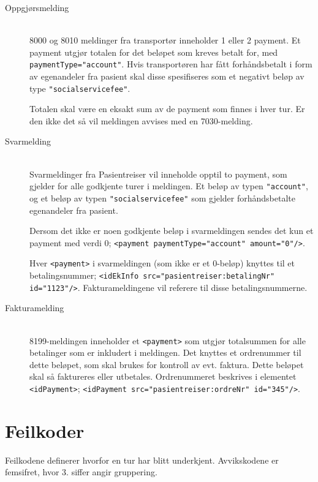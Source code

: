 \documentclass[a4paper,titlepage,norsk,11pt]{article}
\begin{document}
\begin{description}

  \item[Oppgjørsmelding] \hfill \\
  8000 og 8010 meldinger fra transportør inneholder 1 eller 2 payment. Et payment utgjør totalen for det beløpet som kreves betalt for, med \lstinline{paymentType="account"}. Hvis transportøren har fått forhåndsbetalt i form av egenandeler fra pasient skal disse spesifiseres som et negativt beløp av type \lstinline{"socialservicefee"}.

  Totalen skal være en eksakt sum av de payment som finnes i hver tur. Er den ikke det så vil meldingen avvises med en 7030-melding.

  \item[Svarmelding] \hfill \\
  Svarmeldinger fra Pasientreiser vil inneholde opptil to payment, som gjelder for alle godkjente turer i meldingen. Et beløp av typen \lstinline{"account"}, og et beløp av typen \lstinline{"socialservicefee"} som gjelder forhåndsbetalte egenandeler fra pasient.

  Dersom det ikke er noen godkjente beløp i svarmeldingen sendes det kun et payment med verdi 0; \lstinline{<payment paymentType="account" amount="0"/>}.

  Hver \lstinline{<payment>} i svarmeldingen (som ikke er et 0-beløp) knyttes til et betalingsnummer; \lstinline{<idEkInfo src="pasientreiser:betalingNr" id="1123"/>}. Fakturameldingene vil referere til disse betalingsnummerne.

	\item[Fakturamelding] \hfill \\
	8199-meldingen inneholder et \lstinline{<payment>} som utgjør totalsummen for alle betalinger som er inkludert i meldingen. Det knyttes et ordrenummer til dette beløpet, som skal brukes for kontroll av evt. faktura. Dette beløpet skal så faktureres eller utbetales. Ordrenummeret beskrives i elementet \lstinline{<idPayment>}; \lstinline{<idPayment src="pasientreiser:ordreNr" id="345"/>}.

\end{description}

\section{Feilkoder}

Feilkodene definerer hvorfor en tur har blitt underkjent. Avvikskodene er femsifret, hvor 3. siffer angir gruppering.
\end{document}
